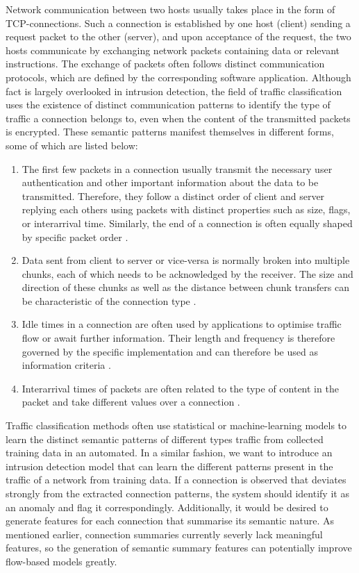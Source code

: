 \documentclass[a4paper,12pt,twoside]{article}
\begin{document}
Network communication between two hosts usually takes place in the form of TCP-connections. Such a connection is established by one host (client) sending a request packet to the other (server), and upon acceptance of the request, the two hosts communicate by exchanging network packets containing data or relevant instructions. The exchange of packets often follows distinct communication protocols, which are defined by the corresponding software application. Although fact is largely overlooked in intrusion detection, the field of traffic classification uses the existence of distinct communication patterns to identify the type of traffic a connection belongs to, even when the content of the transmitted packets is encrypted. These semantic patterns manifest themselves in different forms, some of which are listed below:

\begin{enumerate}
\item The first few packets in a connection usually transmit the necessary user authentication and other important information about the data to be transmitted. Therefore, they follow a distinct order of client and server replying each others using packets with distinct properties such as size, flags, or interarrival time. Similarly, the end of a connection is often equally shaped by specific packet order \cite{bernaille2006traffic}. 
\item Data sent from client to server or vice-versa is normally broken into multiple chunks, each of which needs to be acknowledged by the receiver. The size and direction of these chunks as well as the distance between chunk transfers can be characteristic of the connection type \cite{hernandez2005understanding}.
\item Idle times in a connection are often used by applications to optimise traffic flow or await further information. Their length and frequency is therefore governed by the specific implementation and can therefore be used as information criteria \cite{mcgregor2004flow}.
\item Interarrival times of packets are often related to the type of content in the packet and take different values over a connection \cite{mcgregor2004flow}.
\end{enumerate}

Traffic classification methods often use statistical or machine-learning models to learn the distinct semantic patterns of different types  traffic from collected training data in an automated. In a similar fashion, we want to introduce an intrusion detection model that can learn the different patterns present in the traffic of a network from training data. If a connection is observed that deviates strongly from the extracted connection patterns, the system should identify it as an anomaly and flag it correspondingly. Additionally, it would be desired to generate features for each connection that summarise its semantic nature. As mentioned earlier, connection summaries currently severly lack meaningful features, so the generation of semantic summary features can potentially improve flow-based models greatly.
\end{document}
